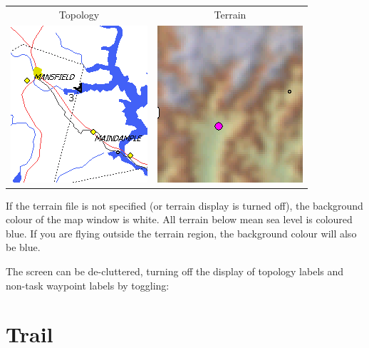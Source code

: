\documentclass[a4paper,12pt]{refrep}
\begin{document}
\begin{center}
\begin{tabular}{c c}
Topology & Terrain \\
\includegraphics[angle=0,width=0.4\linewidth,keepaspectratio='true']{figures/cut-topo.png} &
\includegraphics[angle=0,width=0.4\linewidth,keepaspectratio='true']{figures/cut-terrain.png} \\
\end{tabular}

\end{center}

If the terrain file is not specified (or terrain display is turned
off), the background colour of the map window is white.  All terrain
below mean sea level is coloured blue.  If you are flying outside the
terrain region, the background colour will also be blue.

The screen can be de-cluttered, turning off the display of topology
labels and non-task waypoint labels by toggling:
\begin{quote}
\blink{}
\end{quote}


\section{Trail}\label{sec:trail}
\end{document}
